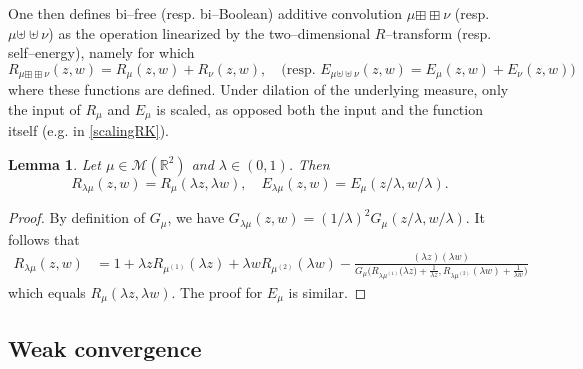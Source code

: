 \documentclass{amsart}
\newtheorem{lemma}[theorem]{Lemma}
\theoremstyle{definition}
\theoremstyle{remark}
\numberwithin{equation}{section}
\begin{document}
One then defines bi--free (resp. bi--Boolean) additive convolution $\mu {\boxplus\boxplus} \nu$ (resp. $\mu{\uplus\uplus}\nu$) as the operation linearized by the two--dimensional $R$--transform (resp. self--energy), namely for which
\[
    R_{\mu{\boxplus\boxplus} \nu}(z,w)=R_\mu(z,w)+R_\nu(z,w), \quad \big(\text{resp. }
    E_{\mu{\uplus\uplus} \nu}(z,w)=E_\mu(z,w)+E_\nu(z,w)\big)
\]
where these functions are defined. Under dilation of the underlying measure, only the input of $R_\mu$ and $E_\mu$ is scaled, as opposed both the input and the function itself (e.g. in 
    \eqref{scalingRK}). 
\begin{lemma}\label{scalingRbi} Let $\mu\in\mathcal{M}(\mathbb{R}^2)$ and $\lambda \in (0,1)$. Then
\[
    R_{\lambda \mu} (z,w) = R_\mu(\lambda z,\lambda w), \quad E_{\lambda \mu}(z,w)=E_\mu( z/\lambda, w/ \lambda).
\]
\end{lemma}
\begin{proof}
    By definition of $G_\mu$, we have $G_{\lambda \mu}(z,w)=(1/\lambda)^2G_{ \mu}(z/\lambda, w/\lambda)$. It follows that
    \begin{align*}
        R_{\lambda \mu}(z,w) &= 1+\lambda z R_{{\mu}^{(1)}}(\lambda z) +\lambda wR_{{\mu}^{(2)}}(\lambda w)-\frac{(\lambda z)(\lambda w)}{G_{\mu}\big(R_{{\lambda \mu}^{(1)}}\big(\lambda z)+\frac{1}{\lambda z},R_{{\lambda\mu}^{(2)}}(\lambda w)+\frac{1}{\lambda w}\big)}
    \end{align*}
    which equals $R_\mu(\lambda z,\lambda w)$.
    The proof for $E_\mu$ is similar.
\end{proof}

\subsection{Weak convergence}
\end{document}
